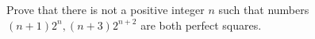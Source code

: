 Prove that there is not a positive integer $n$ such  that numbers  $(n+1)2^n, (n+3)2^{n+2}$ are both perfect squares.
